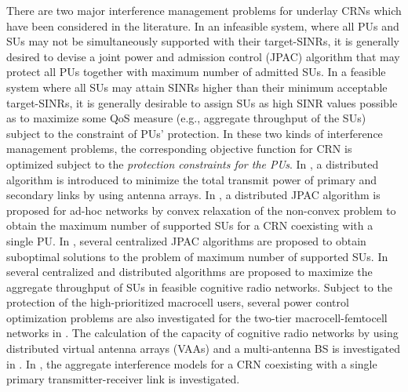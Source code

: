 \documentclass[journal,twoside]{IEEEtran}
\begin{document}
	There are two major interference management problems for underlay CRNs which have been considered  in the literature. In an infeasible system, where all PUs and SUs may not be simultaneously supported with their target-SINRs, it is generally desired to devise a joint power and admission control (JPAC) algorithm that may protect all PUs together with maximum number of admitted SUs.
In a feasible system where all SUs may attain SINRs higher than their minimum acceptable target-SINRs, it is generally desirable to assign SUs as high SINR values possible as to maximize some QoS measure (e.g., aggregate throughput of the SUs) subject to the constraint of PUs' protection.
In these two kinds of interference management problems, the corresponding objective function for CRN is optimized subject to the \textit{protection constraints for the PUs}. 
	In \cite{distributed_JPAC_antenna_arrays}, a distributed algorithm is introduced to minimize the total transmit power of primary and secondary links by using antenna arrays. In \cite{JPAC_adhoc_convex_relaxation_single_PU}, a distributed JPAC algorithm is proposed for ad-hoc networks by convex relaxation of the non-convex problem to obtain the maximum number of supported SUs for a CRN coexisting with a single PU. In \cite{7, JPAC_SSA1,ISMIRA, LGRA,monemi_ESRPA}, several centralized JPAC algorithms are proposed to obtain suboptimal solutions to the problem of maximum number of supported SUs. In \cite{throughput_in_mesh_networks,bad_ITL6_IET_throughput,GP_bad_ITL,badITL4,throughput_coupled_interference_game_bad_ITL,Robust_Max_Throughput_Wang_2015,throughput_distributed_game_bad_ITL,Beamforming_Cognitive_2015,Max_Throughput_Femto_Zhang_2015} several centralized and distributed algorithms are proposed to maximize the aggregate throughput of SUs in feasible cognitive radio networks. Subject to the protection of the high-prioritized macrocell users, several power control optimization problems are also investigated for the two-tier macrocell-femtocell networks in \cite{femto_tow_tier_ngo_1,femto_tow_tier_ngo_2,hierarchical_tow_tier_guruacharya,Max_Throughput_Femto_Zhang_2015}. The calculation of the capacity of cognitive radio networks by using distributed virtual antenna arrays (VAAs) and a multi-antenna BS is investigated in \cite{wang5}. In \cite{wang4}, the aggregate interference models for a CRN coexisting with a single primary transmitter-receiver link is investigated.
	
	
\end{document}
